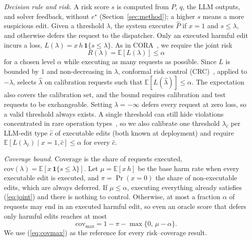 \textit{Decision rule and risk.} A risk score $s$ is computed from $P$, $q$, the LLM outputs, and
solver feedback, without $e^\star$ (Section~\ref{sec:method}); a higher $s$ means a more suspicious edit. Given a
threshold $\lambda$, the system executes $\hat{P}$ if $x = 1$ and $s \le \lambda$, and otherwise
defers the request to the dispatcher. Only an executed harmful edit incurs a loss,
$L(\lambda) = x\,h\,\mathbf{1}\{s \le \lambda\}$. As in CORA~\cite{feng2026cora}, we require the
joint risk
\begin{equation}\label{eq:joint}
  R(\lambda) = \mathbb{E}\left[L(\lambda)\right] \le \alpha
\end{equation}
for a chosen level $\alpha$ while executing as many requests as possible. Since $L$ is bounded by $1$ and non-decreasing in $\lambda$,
conformal risk control (CRC)~\cite[Thm.~1]{angelopoulos2024crc}, applied to $-\lambda$,
selects $\hat{\lambda}$ on calibration requests such that $\mathbb{E}[L(\hat{\lambda})] \le \alpha$.
The expectation also covers the calibration set, and the bound requires calibration and test
requests to be exchangeable. Setting $\lambda = -\infty$ defers every request at zero loss, so a
valid threshold always exists.
A single threshold can still hide violations
concentrated in rare operation types~\cite{rahman2026rolestratified}, so we also calibrate one
threshold $\lambda_{\hat{c}}$ per LLM-edit type $\hat{c}$ of executable edits (both known at deployment) and require
$\mathbb{E}[L(\lambda_{\hat{c}}) \mid x = 1, \hat{c}] \le \alpha$ for every $\hat{c}$.

\textit{Coverage bound.} Coverage is the share of requests executed,
$\mathrm{cov}(\lambda) = \mathbb{E}[x\,\mathbf{1}\{s \le \lambda\}]$. Let $\mu = \mathbb{E}[x\,h]$
be the base harm rate when every executable edit is executed, and $\pi = \Pr(x = 0)$ the share of
non-executable edits, which are always deferred. If $\mu \le \alpha$, executing everything already
satisfies (\ref{eq:joint}) and there is nothing to control. Otherwise, at most a fraction $\alpha$ of
requests may end in an executed harmful edit, so even an oracle score that defers only harmful
edits reaches at most
\begin{equation}\label{eq:covmax}
  \mathrm{cov}_{\max} = 1 - \pi - \max\{0,\, \mu - \alpha\}.
\end{equation}
We use (\ref{eq:covmax}) as the reference for every risk--coverage result.
